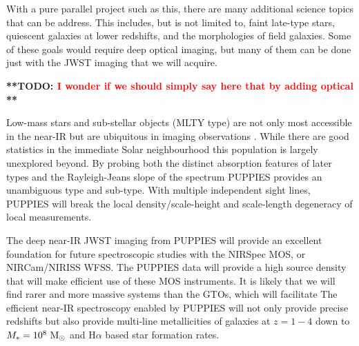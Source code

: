 \documentclass[12pt]{article}
\newcommand{\todo}[1]{\textbf{**TODO: \textcolor{red}{#1}**}}
\begin{document}
With a pure parallel project such as this, there are many additional science topics that can be address.  This includes, but is not limited to, faint late-type stars, quiescent galaxies at lower redshifts, and the morphologies of field galaxies.  Some of these goals would require deep optical imaging, but many of them can be done just with the JWST imaging that we will acquire.

\todo{I wonder if we should simply say here that by adding optical }






Low-mass stars and sub-stellar objects (MLTY type) are not only most accessible in the near-IR but are ubiquitous in imaging observations . While there are good statistics in the immediate Solar neighbourhood this  population is largely unexplored beyond. By probing both the distinct absorption features of later types and the Rayleigh-Jeans slope of the spectrum PUPPIES provides an unambiguous type and sub-type. With multiple independent sight lines, PUPPIES will break the local density/scale-height and scale-length degeneracy of local measurements. 





The deep near-IR JWST imaging from PUPPIES will provide an excellent foundation for future spectroscopic studies with the NIRSpec MOS, or NIRCam/NIRISS WFSS.   The PUPPIES data will provide a high source density that will make efficient use of these MOS instruments.   It is likely that we will find rarer and more massive systems than the GTOs, which will facilitate The efficient near-IR spectroscopy enabled by PUPPIES will not only provide precise redshifts but also provide multi-line metallicities of galaxies at $z=1-4$ down to $M_{*}=10^{8}\ {\rm M_{\odot}}$ and H$\alpha$ based star formation rates. 







%
%
\end{document}
